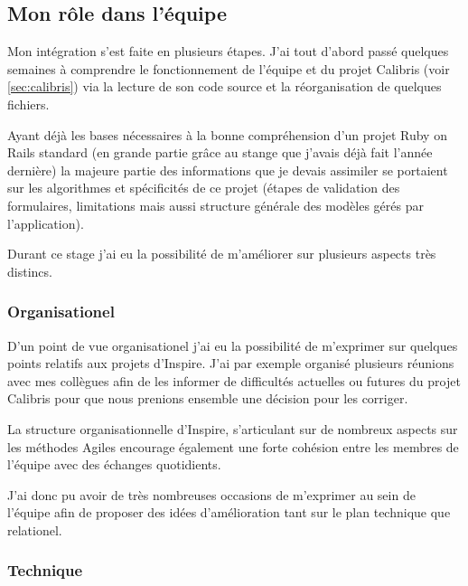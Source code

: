 \documentclass[12pt,a4paper]{book}
\begin{document}
\subsection{Mon rôle dans l'équipe}

Mon intégration s'est faite en plusieurs étapes. J'ai tout d'abord passé quelques semaines à comprendre le fonctionnement de l'équipe et du projet Calibris (voir \cref{sec:calibris}) via la lecture de son code source et la réorganisation de quelques fichiers.

Ayant déjà les bases nécessaires à la bonne compréhension d'un projet Ruby on Rails standard (en grande partie grâce au stange que j'avais déjà fait l'année dernière) la majeure partie des informations que je devais assimiler se portaient sur les algorithmes et spécificités de ce projet (étapes de validation des formulaires, limitations mais aussi structure générale des modèles gérés par l'application).

Durant ce stage j'ai eu la possibilité de m'améliorer sur plusieurs aspects très distincs.

\subsubsection{Organisationel}

D'un point de vue organisationel j'ai eu la possibilité de m'exprimer sur quelques points relatifs aux projets d'Inspire. J'ai par exemple organisé plusieurs réunions avec mes collègues afin de les informer de difficultés actuelles ou futures du projet Calibris pour que nous prenions ensemble une décision pour les corriger.

La structure organisationnelle d'Inspire, s'articulant sur de nombreux aspects sur les méthodes Agiles encourage également une forte cohésion entre les membres de l'équipe avec des échanges quotidients.

J'ai donc pu avoir de très nombreuses occasions de m'exprimer au sein de l'équipe afin de proposer des idées d'amélioration tant sur le plan technique que relationel.

\subsubsection{Technique}
\end{document}
